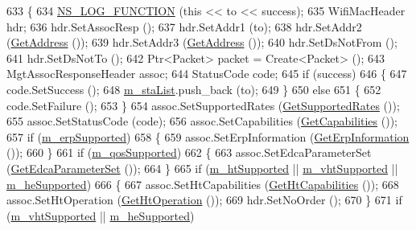 \begin{DoxyCode}
633 \{
634   \hyperlink{log-macros-disabled_8h_a90b90d5bad1f39cb1b64923ea94c0761}{NS\_LOG\_FUNCTION} (\textcolor{keyword}{this} << to << success);
635   WifiMacHeader hdr;
636   hdr.SetAssocResp ();
637   hdr.SetAddr1 (to);
638   hdr.SetAddr2 (\hyperlink{classns3_1_1RegularWifiMac_aea719a7d05fbc664c50479fc900777b7}{GetAddress} ());
639   hdr.SetAddr3 (\hyperlink{classns3_1_1RegularWifiMac_aea719a7d05fbc664c50479fc900777b7}{GetAddress} ());
640   hdr.SetDsNotFrom ();
641   hdr.SetDsNotTo ();
642   Ptr<Packet> packet = Create<Packet> ();
643   MgtAssocResponseHeader assoc;
644   StatusCode code;
645   \textcolor{keywordflow}{if} (success)
646     \{
647       code.SetSuccess ();
648       \hyperlink{classns3_1_1ApWifiMac_a2a483f2002457f12a9e53e4b227cf1e8}{m\_staList}.push\_back (to);
649     \}
650   \textcolor{keywordflow}{else}
651     \{
652       code.SetFailure ();
653     \}
654   assoc.SetSupportedRates (\hyperlink{classns3_1_1ApWifiMac_a3d1278fa6624859d50b4ed984125de30}{GetSupportedRates} ());
655   assoc.SetStatusCode (code);
656   assoc.SetCapabilities (\hyperlink{classns3_1_1ApWifiMac_a5794cfc6ec6c72f335b36f302a83178a}{GetCapabilities} ());
657   \textcolor{keywordflow}{if} (\hyperlink{classns3_1_1RegularWifiMac_ab90230e9a9ea6331758a53a316ee2b38}{m\_erpSupported})
658     \{
659       assoc.SetErpInformation (\hyperlink{classns3_1_1ApWifiMac_ae88a116a1cdc0895105765b2c27e2f1a}{GetErpInformation} ());
660     \}
661   \textcolor{keywordflow}{if} (\hyperlink{classns3_1_1RegularWifiMac_aeecdb918687493a8efdd70304bc0cee9}{m\_qosSupported})
662     \{
663       assoc.SetEdcaParameterSet (\hyperlink{classns3_1_1ApWifiMac_a6b29faae7352877a1aa97a2146725ff5}{GetEdcaParameterSet} ());
664     \}
665   \textcolor{keywordflow}{if} (\hyperlink{classns3_1_1RegularWifiMac_a8950c44b8cf2ad1f9274821cf88adc7b}{m\_htSupported} || \hyperlink{classns3_1_1RegularWifiMac_a151f330fdeb3f83f9ec7cf07537f0e86}{m\_vhtSupported} || 
      \hyperlink{classns3_1_1RegularWifiMac_a9458143c722fa0b6e5d223d41585842a}{m\_heSupported})
666     \{
667       assoc.SetHtCapabilities (\hyperlink{classns3_1_1RegularWifiMac_ae2b0a52735a938a0f1ca233397ae2185}{GetHtCapabilities} ());
668       assoc.SetHtOperation (\hyperlink{classns3_1_1ApWifiMac_ae67f8b753332b379d189007ffee40733}{GetHtOperation} ());
669       hdr.SetNoOrder ();
670     \}
671   \textcolor{keywordflow}{if} (\hyperlink{classns3_1_1RegularWifiMac_a151f330fdeb3f83f9ec7cf07537f0e86}{m\_vhtSupported} || \hyperlink{classns3_1_1RegularWifiMac_a9458143c722fa0b6e5d223d41585842a}{m\_heSupported})

\end{DoxyCode}
